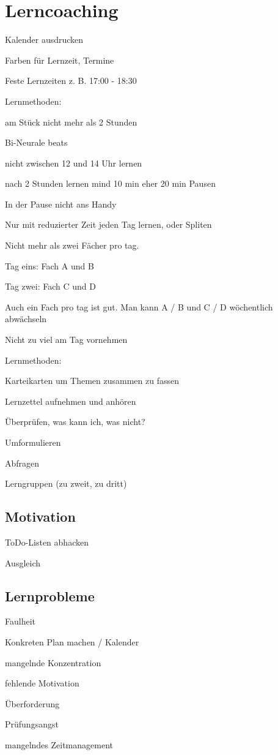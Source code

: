 \chapter{Lerncoaching}

Kalender ausdrucken

Farben für Lernzeit, Termine

Feste Lernzeiten z. B. 17:00 - 18:30 


Lernmethoden:

\startitemize[packed]
\item am Stück nicht mehr als 2 Stunden
\item Bi-Neurale beats
\item nicht zwischen 12 und 14 Uhr lernen
\item nach 2 Stunden lernen mind 10 min eher 20 min Pausen
\item In der Pause nicht ans Handy
\item Nur mit reduzierter Zeit jeden Tag lernen, oder Spliten
\item Nicht mehr als zwei Fächer pro tag. 
\startitemize[packed]
\item Tag eins: Fach A und B
\item Tag zwei: Fach C und D
\stopitemize
\item Auch ein Fach pro tag ist gut. Man kann A / B und C / D wöchentlich abwächseln
\item Nicht zu viel am Tag vornehmen
\stopitemize


Lernmethoden:

\startitemize[packed]
\item Karteikarten um Themen zusammen zu fassen
\item Lernzettel aufnehmen und anhören
\item Überprüfen, was kann ich, was nicht?
\item Umformulieren
\item Abfragen
\item Lerngruppen (zu zweit, zu dritt)
\stopitemize

\section{Motivation}

\startitemize[packed]
\item ToDo-Listen abhacken
\item Ausgleich
\stopitemize

\section{Lernprobleme}

\startitemize[packed]
\item Faulheit
\startitemize[packed]
\item Konkreten Plan machen / Kalender
\stopitemize
\item mangelnde Konzentration
\item fehlende Motivation
\item Überforderung
\item Prüfungsangst
\item mangelndes Zeitmanagement
\stopitemize
